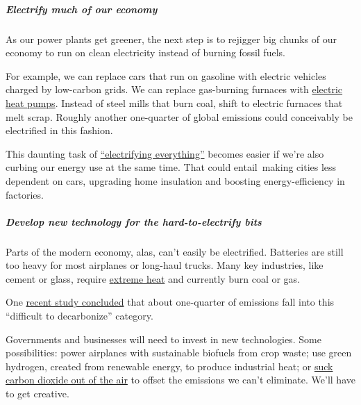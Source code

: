 \hypertarget{electrify-much-of-our-economy}{%
\subparagraph{\texorpdfstring{\textbf{Electrify much of our
economy}}{Electrify much of our economy}}\label{electrify-much-of-our-economy}}

As our power plants get greener, the next step is to rejigger big chunks
of our economy to run on clean electricity instead of burning fossil
fuels.

For example, we can replace cars that run on gasoline with electric
vehicles charged by low-carbon grids. We can replace gas-burning
furnaces with
\href{https://www.nytimes3xbfgragh.onion/2019/05/01/opinion/climate-change-gas-electricity.html}{electric
heat pumps}. Instead of steel mills that burn coal, shift to electric
furnaces that melt scrap. Roughly another one-quarter of global
emissions could conceivably be electrified in this fashion.

This daunting task of
\href{https://www.vox.com/2016/9/19/12938086/electrify-everything}{``electrifying
everything''} becomes easier if we're also curbing our energy use at the
same time. That could entail~making cities less dependent on cars,
upgrading home insulation and boosting energy-efficiency in factories.

\hypertarget{develop-new-technology-for-the-hard-to-electrify-bits}{%
\subparagraph{\texorpdfstring{\textbf{Develop new technology for the
hard-to-electrify
bits}}{Develop new technology for the hard-to-electrify bits}}\label{develop-new-technology-for-the-hard-to-electrify-bits}}

Parts of the modern economy, alas, can't easily be electrified.
Batteries are still too heavy for most airplanes or long-haul trucks.
Many key industries, like cement or glass, require
\href{https://energypolicy.columbia.edu/research/report/low-carbon-heat-solutions-heavy-industry-sources-options-and-costs-today}{e}\href{https://energypolicy.columbia.edu/research/report/low-carbon-heat-solutions-heavy-industry-sources-options-and-costs-today}{xtreme
heat} and currently burn coal or gas.

One
\href{https://science.sciencemag.org/content/360/6396/eaas9793}{recent
study concluded} that about one-quarter of emissions fall into this
``difficult to decarbonize'' category.

Governments and businesses will need to invest in new technologies. Some
possibilities: power airplanes with sustainable biofuels from crop
waste; use green hydrogen, created from renewable energy, to produce
industrial heat; or
\href{https://www.nytimes3xbfgragh.onion/2019/04/07/business/energy-environment/climate-change-carbon-engineering.html}{suck
carbon dioxide out of the air} to offset the emissions we can't
eliminate. We'll have to get creative.

